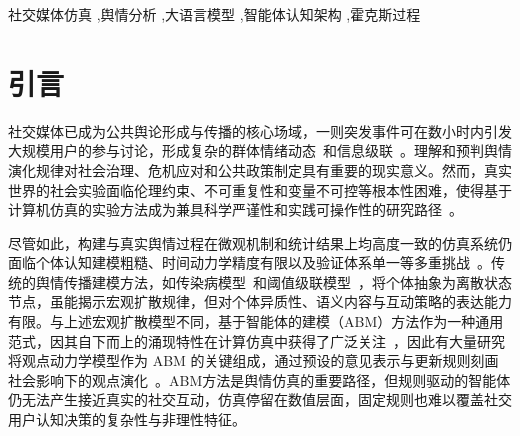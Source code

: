 \documentclass[a4paper,fleqn]{cas-sc}
\begin{document}
\begin{keywords}
社交媒体仿真 \sep 舆情分析 \sep 大语言模型 \sep 智能体认知架构 \sep 霍克斯过程
\end{keywords}

\maketitle

\section{引言}\label{sec:intro}

社交媒体已成为公共舆论形成与传播的核心场域，一则突发事件可在数小时内引发大规模用户的参与讨论，形成复杂的群体情绪动态~\citep{gonzalez_emotional_2010}和信息级联~\citep{goldstein_structure_2012}。理解和预判舆情演化规律对社会治理、危机应对和公共政策制定具有重要的现实意义。然而，真实世界的社会实验面临伦理约束、不可重复性和变量不可控等根本性困难，使得基于计算机仿真的实验方法成为兼具科学严谨性和实践可操作性的研究路径~\citep{bonabeau_agent-based_2002}。

尽管如此，构建与真实舆情过程在微观机制和统计结果上均高度一致的仿真系统仍面临个体认知建模粗糙、时间动力学精度有限以及验证体系单一等多重挑战~\citep{kramer_experimental_2014,zhao_seismic_2015,mcculloch_calibrating_2022}。传统的舆情传播建模方法，如传染病模型~\citep{daley_stochastic_1965}和阈值级联模型~\citep{granovetter_threshold_1978}，将个体抽象为离散状态节点，虽能揭示宏观扩散规律，但对个体异质性、语义内容与互动策略的表达能力有限。与上述宏观扩散模型不同，基于智能体的建模（ABM）方法作为一种通用范式，因其自下而上的涌现特性在计算仿真中获得了广泛关注~\citep{macal_tutorial_2010}，因此有大量研究将观点动力学模型作为 ABM 的关键组成，通过预设的意见表示与更新规则刻画社会影响下的观点演化~\citep{castellano_statistical_2009}。ABM方法是舆情仿真的重要路径，但规则驱动的智能体仍无法产生接近真实的社交互动，仿真停留在数值层面，固定规则也难以覆盖社交用户认知决策的复杂性与非理性特征。
\end{document}
